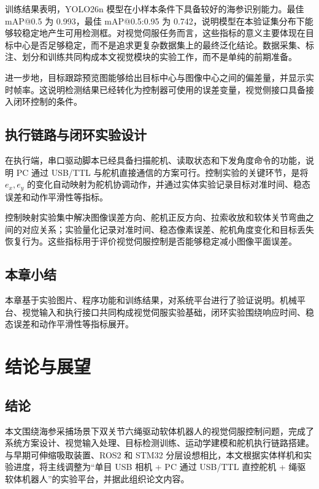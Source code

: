 \documentclass[UTF8,zihao=-4,oneside]{ctexrep}
\begin{document}
训练结果表明，YOLO26n 模型在小样本条件下具备较好的海参识别能力。最佳 mAP@0.5 为 0.993，最佳 mAP@0.5:0.95 为 0.742，说明模型在本验证集分布下能够较稳定地产生可用检测框。对视觉伺服任务而言，这些指标的意义主要体现在目标中心是否足够稳定，而不是追求更复杂数据集上的最终泛化结论。数据采集、标注、划分和训练共同构成本文视觉模块的实验工作，而不是单纯的前期准备。

进一步地，目标跟踪预览图能够给出目标中心与图像中心之间的偏差量，并显示实时帧率。这说明检测结果已经转化为控制器可使用的误差变量，视觉侧接口具备接入闭环控制的条件。

\section{执行链路与闭环实验设计}

在执行端，串口驱动脚本已经具备扫描舵机、读取状态和下发角度命令的功能，说明 PC 通过 USB/TTL 与舵机直接通信的方案可行。控制实验的关键环节，是将 \(e_x,e_y\) 的变化自动映射为舵机协调动作，并通过实体实验记录目标对准时间、稳态误差和动作平滑性等指标。

控制映射实验集中解决图像误差方向、舵机正反方向、拉索收放和软体关节弯曲之间的对应关系；实验量化记录对准时间、稳态像素误差、舵机角度变化和目标丢失恢复行为。这些指标用于评价视觉伺服控制是否能够稳定减小图像平面误差。

\section{本章小结}

本章基于实验图片、程序功能和训练结果，对系统平台进行了验证说明。机械平台、视觉输入和执行接口共同构成视觉伺服实验基础，闭环实验围绕响应时间、稳态误差和动作平滑性等指标展开。

\chapter{结论与展望}

\section{结论}

本文围绕海参采捕场景下双关节六绳驱动软体机器人的视觉伺服控制问题，完成了系统方案设计、视觉输入处理、目标检测训练、运动学建模和舵机执行链路搭建。与早期可伸缩吸取装置、ROS2 和 STM32 分层设想相比，本文根据实体样机和实验进度，将主线调整为“单目 USB 相机 + PC 通过 USB/TTL 直控舵机 + 绳驱软体机器人”的实验平台，并据此组织论文内容。
\end{document}

